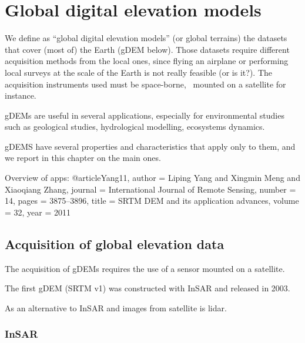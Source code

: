 
\setchapterpreamble[u]{\margintoc}
\graphicspath{{gdem/figs/}}


\chapter{Global digital elevation models}%
\label{chap:gdem}

We define as ``global digital elevation models'' (or global terrains) the datasets that cover (most of) the Earth (gDEM below).%
Those datasets require different acquisition methods from the local ones, since flying an airplane or performing local surveys at the scale of the Earth is not really feasible (or is it?).
The acquisition instruments used must be space-borne, \ie\ mounted on a satellite for instance.

gDEMs are useful in several applications, especially for environmental studies such as geological studies, hydrological modelling, ecosystems dynamics.

gDEMS have several properties and characteristics that apply only to them, and we report in this chapter on the main ones.


Overview of apps:
@article{Yang11,
  author = {Liping Yang and Xingmin Meng and Xiaoqiang Zhang},
  journal = {International Journal of Remote Sensing},
  number = {14},
  pages = {3875--3896},
  title = {{SRTM} {DEM} and its application advances},
  volume = {32},
  year = {2011}}



%
\section[Acquisition of global data]{Acquisition of global elevation data}

The acquisition of gDEMs requires the use of a sensor mounted on a satellite.

The first gDEM (SRTM v1) was constructed with InSAR and released in 2003. 

As an alternative to InSAR and images from satellite is lidar.



\subsection{InSAR}


